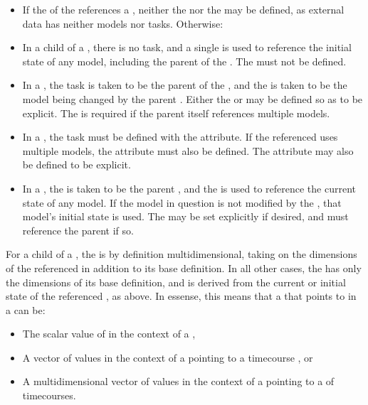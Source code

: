 \begin{itemize}
        \item If the  of the \Variable references a \DataSource, neither the  nor the  may be defined, as external data has neither models nor tasks.  Otherwise:
        \item In a \ComputeChange child of a \Model, there is no task, and a single  is used to reference the initial state of any model, including the parent of the \ComputeChange.  The  must not be defined.
        \item In a \FunctionalRange, the task is taken to be the parent of the \FunctionalRange, and the  is taken to be the model being changed by the parent \AbstractTask.  Either the  or  may be defined so as to be explicit.  The  is required if the parent \AbstractTask itself references multiple models.
        \item In a \DataGenerator, the task must be defined with the  attribute.  If the referenced \AbstractTask uses multiple models, the  attribute must also be defined.  The  attribute may also be defined to be explicit.
        \item In a \SetValue, the  is taken to be the parent \AbstractTask, and the  is used to reference the current state of any model.  If the model in question is not modified by the \AbstractTask, that model's initial state is used.  The  may be set explicitly if desired, and must reference the parent \AbstractTask if so.
\end{itemize}

For a \Variable child of a \DataGenerator, the \Variable is by definition multidimensional, taking on the dimensions of the referenced \AbstractTask in addition to its base definition.  In all other cases, the \Variable has only the dimensions of its base definition, and is derived from the current or initial state of the referenced \Model, as above.  In essense, this means that a \Variable that points to  in a \Model can be:
\begin{itemize}
        \item The scalar value of  in the context of a \ComputeChange,
        \item A vector of  values in the context of a \DataGenerator pointing to a timecourse \Task, or
        \item A multidimensional vector of  values in the context of a \DataGenerator pointing to a \RepeatedTask of timecourses.
\end{itemize}

